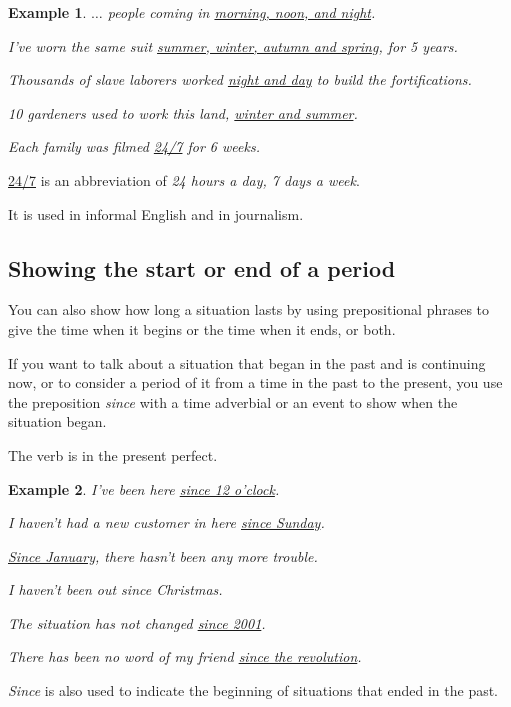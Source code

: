 \documentclass[oneside]{book}
\numberwithin{equation}{section}
\newtheorem{example}{Example}[section]
\begin{document}
\begin{example}
    $\ldots$ people coming in \underline{morning, noon, and night}.
    
    I've worn the same suit \underline{summer, winter, autumn and spring}, for 5 years.
    
    Thousands of slave laborers worked \underline{night and day} to build the fortifications.
    
    10 gardeners used to work this land, \underline{winter and summer}.
    
    Each family was filmed \underline{24/7} for 6 weeks.
\end{example}
\underline{24/7} is an abbreviation of \textit{24 hours a day, 7 days a week}.

It is used in informal English and in journalism.

\subsection{Showing the start or end of a period}
\noindent{} You can also show how long a situation lasts by using prepositional phrases to give the time when it begins or the time when it ends, or both.

%
If you want to talk about a situation that began in the past and is continuing now, or to consider a period of it from a time in the past to the present, you use the preposition \textit{since} with a time adverbial or an event to show when the situation began.

The verb is in the present perfect.
\begin{example}
    I've been here \underline{since 12 o'clock}.
    
    I haven't had a new customer in here \underline{since Sunday}.
    
    \underline{Since January}, there hasn't been any more trouble.
    
    I haven't been out since Christmas.
    
    The situation has not changed \underline{since 2001}.
    
    There has been no word of my friend \underline{since the revolution}.
\end{example}
\textit{Since} is also used to indicate the beginning of situations that ended in the past.
\end{document}

